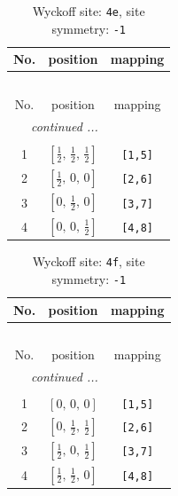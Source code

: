 \documentclass[fleqn,8pt]{jsarticle}
\begin{document}
\begin{longtable}{ccc}
\caption{Wyckoff site: {\tt 4e}, site symmetry: {\tt -1}}
 \\
 \hline \hline
No. & position & mapping \\ \hline \endfirsthead

\multicolumn{2}{l}{\tablename\ \thetable{}} \\
 \hline \hline
No. & position & mapping \\ \hline \endhead

 \hline \hline
\multicolumn{2}{r}{\footnotesize\it continued ...} \\ \endfoot

 \hline \hline
\multicolumn{2}{r}{} \\ \endlastfoot

1 & $\left[ \frac{1}{2},\, \frac{1}{2},\, \frac{1}{2} \right]$ & {\tt [1,5]} \\ \hline
2 & $\left[ \frac{1}{2},\, 0,\, 0 \right]$ & {\tt [2,6]} \\ \hline
3 & $\left[ 0,\, \frac{1}{2},\, 0 \right]$ & {\tt [3,7]} \\ \hline
4 & $\left[ 0,\, 0,\, \frac{1}{2} \right]$ & {\tt [4,8]} \\
\end{longtable}
\renewcommand{\arraystretch}{1.2}
\begin{longtable}{ccc}
\caption{Wyckoff site: {\tt 4f}, site symmetry: {\tt -1}}
 \\
 \hline \hline
No. & position & mapping \\ \hline \endfirsthead

\multicolumn{2}{l}{\tablename\ \thetable{}} \\
 \hline \hline
No. & position & mapping \\ \hline \endhead

 \hline \hline
\multicolumn{2}{r}{\footnotesize\it continued ...} \\ \endfoot

 \hline \hline
\multicolumn{2}{r}{} \\ \endlastfoot

1 & $\left[ 0,\, 0,\, 0 \right]$ & {\tt [1,5]} \\ \hline
2 & $\left[ 0,\, \frac{1}{2},\, \frac{1}{2} \right]$ & {\tt [2,6]} \\ \hline
3 & $\left[ \frac{1}{2},\, 0,\, \frac{1}{2} \right]$ & {\tt [3,7]} \\ \hline
4 & $\left[ \frac{1}{2},\, \frac{1}{2},\, 0 \right]$ & {\tt [4,8]} \\
\end{longtable}
\end{document}
